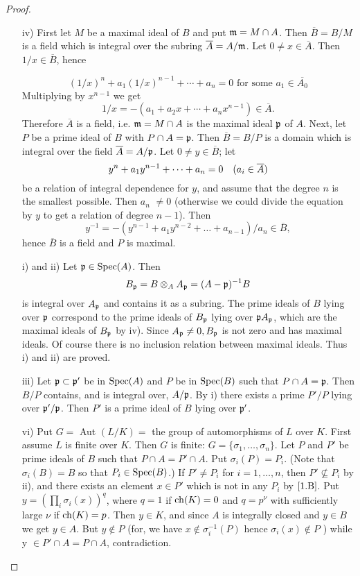\documentclass[../main]{subfiles}
\begin{document}
\begin{proof} 
\begin{enumerate}
\item[iv)] First let $M$ be a maximal ideal of $B$ and put $\mathfrak{m} = M \cap A$. Then $\overline{B}=B/M$ is a field which is integral over the subring $\overline{A}=A/\mathfrak{m}$. Let $0 \neq x \in \overline{A}$. Then $1 / x \in \overline{B}$, hence

\[(1 / x)^n+a_1(1 / x)^{n-1}+\cdots+a_n=0 \text { for some } a_1 \in \overline{A_0}
\]
Multiplying by $x^{n-1}$ we get \[1 / x=-(a_1+a_2 x+\cdots+a_n x^{n-1})\in \overline{A}.\] Therefore $\overline{A}$ is a field, i.e. $\mathfrak{m} = M \cap A$ is the maximal ideal $\mathfrak{p}$ of $A$. Next, let $P$ be a prime ideal of $B$ with $P \cap A=\mathfrak{p}$. Then $\overline{B}=B / P$ is a domain which is integral over the field $\overline{A}=A / \mathfrak{p}$. Let $0 \neq y \in \overline{B}$; let \[y^n+a_1 y^{n-1}+\dots+a_n=0\for{a_i \in \overline{A}}\] be a relation of integral dependence for $y$, and assume that the degree $n$ is the smallest possible. Then $a_n$ $\neq 0$ (otherwise we could divide the equation by $y$ to get a relation of degree $n-1$). Then \[y^{-1}=-(y^{n-1}+a_1 y^{n-2}+\dots +a_{n-1}) / a_n \in \overline{B},\] hence $\overline{B}$ is a field and $P$ is maximal.


  \item[i) and ii)] Let $\mathfrak{p} \in \operatorname{Spec}(A)$. Then \[B_{\mathfrak{p}}=B\otimes_AA_{\mathfrak{p}}=(A-\mathfrak{p})^{-1}B\] is integral over $A_{\mathfrak{p}}$ and contains it as a subring. The prime ideals of $B$ lying over $\mathfrak{p}$ correspond to the prime ideals of $B_{\mathfrak{p}}$ lying over $\mathfrak{p} A_{\mathfrak{p}}$, which are the maximal ideals of $B_{\mathfrak{p}}$ by iv). Since $A_{\mathfrak{p}} \neq 0, B_{\mathfrak{p}}$ is not zero and has maximal ideals. Of course there is no inclusion relation between maximal ideals. Thus i) and ii) are proved.

  \item[iii)] Let $\mathfrak{p} \subset \mathfrak{p}'$ be in $\operatorname{Spec}(A)$ and $P$ be in $\operatorname{Spec}(B)$ such that $P \cap A= \mathfrak{p}$. Then $B/P$ contains, and is integral over, $A /\mathfrak{p}$. By i) there exists a prime $P' / P$ lying over $\mathfrak{p}' / \mathfrak{p}$. Then $P'$ is a prime ideal of $B$ lying over $\mathfrak{p}'$.

  \item[vi)] Put $G=$ Aut $(L / K)=$ the group of automorphisms of $L$ over $K$. First assume $L$ is finite over $K$. Then $G$ is finite: $G=\{\sigma_1, \ldots, \sigma_n\}$. Let $P$ and $P'$ be prime ideals of $B$ such that $P \cap A=P' \cap A$. Put $\sigma_i(P)=P_i$. (Note that $\sigma_i(B)=B$ so that $P_i \in \operatorname{Spec}(B)$.) If $P' \neq P_i$ for $i=1, \ldots, n$, then $P' \nsubseteq P_i$ by ii), and there exists an element $x \in P'$ which is not in any $P_i$ by $\ref{1.B}$. Put $y=(\prod_i\sigma_i(x))^q$, where $q=1$ if $\operatorname{ch}({K})=0$ and $q=p^{\nu}$ with sufficiently large $\nu$ if $\operatorname{ch}(K)=p$. Then $y \in {K}$, and since $A$ is integrally closed and ${y} \in B$ we get $y \in A$. But $y \notin P$ (for, we have $x \notin \sigma_i^{-1}(P)$ hence $\sigma_i(x) \notin P$ ) while y $\in P' \cap A=P \cap A$, contradiction.
  

\end{enumerate}
\end{proof}
\end{document}
